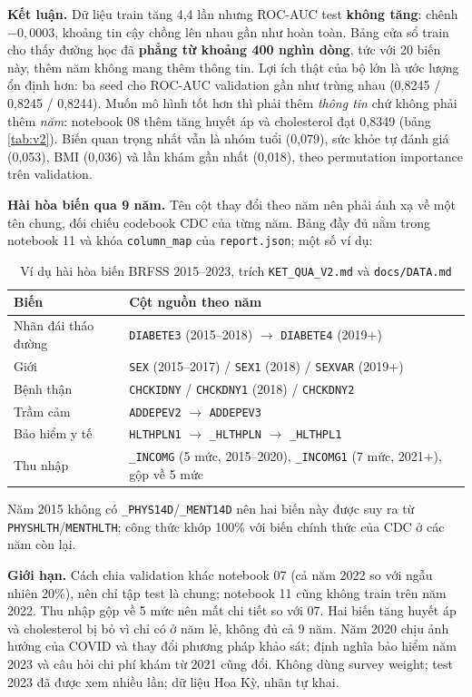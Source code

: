 \textbf{Kết luận.} Dữ liệu train tăng 4,4 lần nhưng ROC-AUC test \textbf{không tăng}: chênh $-0{,}0003$, khoảng tin cậy chồng lên nhau gần như hoàn toàn. Bảng cửa sổ train cho thấy đường học đã \textbf{phẳng từ khoảng 400 nghìn dòng}, tức với 20 biến này, thêm năm không mang thêm thông tin. Lợi ích thật của bộ lớn là ước lượng ổn định hơn: ba seed cho ROC-AUC validation gần như trùng nhau (0,8245 / 0,8245 / 0,8244). Muốn mô hình tốt hơn thì phải thêm \emph{thông tin} chứ không phải thêm \emph{năm}: notebook 08 thêm tăng huyết áp và cholesterol đạt 0,8349 (bảng \ref{tab:v2}). Biến quan trọng nhất vẫn là nhóm tuổi (0,079), sức khỏe tự đánh giá (0,053), BMI (0,036) và lần khám gần nhất (0,018), theo permutation importance trên validation.

\textbf{Hài hòa biến qua 9 năm.} Tên cột thay đổi theo năm nên phải ánh xạ về một tên chung, đối chiếu codebook CDC của từng năm. Bảng đầy đủ nằm trong notebook 11 và khóa \texttt{column\_map} của \texttt{report.json}; một số ví dụ:
\begin{table}[H]\centering\small
\begin{tabular}{ll}\toprule
Biến & Cột nguồn theo năm\\\midrule
Nhãn đái tháo đường & \texttt{DIABETE3} (2015--2018) $\rightarrow$ \texttt{DIABETE4} (2019+)\\
Giới & \texttt{SEX} (2015--2017) / \texttt{SEX1} (2018) / \texttt{SEXVAR} (2019+)\\
Bệnh thận & \texttt{CHCKIDNY} / \texttt{CHCKDNY1} (2018) / \texttt{CHCKDNY2}\\
Trầm cảm & \texttt{ADDEPEV2} $\rightarrow$ \texttt{ADDEPEV3}\\
Bảo hiểm y tế & \texttt{HLTHPLN1} $\rightarrow$ \texttt{\_HLTHPLN} $\rightarrow$ \texttt{\_HLTHPL1}\\
Thu nhập & \texttt{\_INCOMG} (5 mức, 2015--2020), \texttt{\_INCOMG1} (7 mức, 2021+), gộp về 5 mức\\\bottomrule
\end{tabular}\caption{Ví dụ hài hòa biến BRFSS 2015--2023, trích \texttt{KET\_QUA\_V2.md} và \texttt{docs/DATA.md}}\end{table}
Năm 2015 không có \texttt{\_PHYS14D}/\texttt{\_MENT14D} nên hai biến này được suy ra từ \texttt{PHYSHLTH}/\texttt{MENTHLTH}; công thức khớp 100\% với biến chính thức của CDC ở các năm còn lại.

\textbf{Giới hạn.} Cách chia validation khác notebook 07 (cả năm 2022 so với ngẫu nhiên 20\%), nên chỉ tập test là chung; notebook 11 cũng không train trên năm 2022. Thu nhập gộp về 5 mức nên mất chi tiết so với 07. Hai biến tăng huyết áp và cholesterol bị bỏ vì chỉ có ở năm lẻ, không đủ cả 9 năm. Năm 2020 chịu ảnh hưởng của COVID và thay đổi phương pháp khảo sát; định nghĩa bảo hiểm năm 2023 và câu hỏi chi phí khám từ 2021 cũng đổi. Không dùng survey weight; test 2023 đã được xem nhiều lần; dữ liệu Hoa Kỳ, nhãn tự khai.
